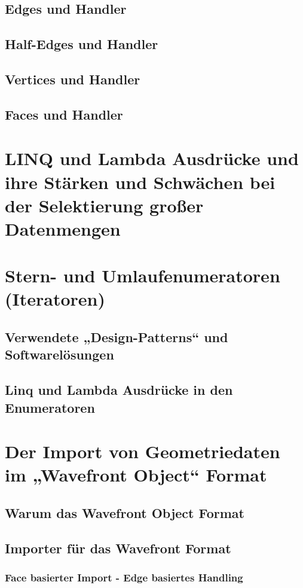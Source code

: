 \documentclass[12pt,a4paper]{scrreprt}
\begin{document}
		\subsection {Edges und Handler}
		\subsection {Half-Edges und Handler}
		\subsection {Vertices und Handler}
		\subsection {Faces und Handler}
	\section {LINQ und Lambda Ausdrücke und ihre Stärken und Schwächen bei der Selektierung großer Datenmengen}
	\section {Stern- und Umlaufenumeratoren (Iteratoren)}
		\subsection {Verwendete „Design-Patterns“ und Softwarelösungen}
		\subsection {Linq und Lambda Ausdrücke in den Enumeratoren}
	\section {Der Import von Geometriedaten im „Wavefront Object“ Format}
		\subsection {Warum das Wavefront Object Format}
		\subsection {Importer für das Wavefront Format}
			\subsubsection {Face basierter Import - Edge basiertes Handling}
\end{document}
